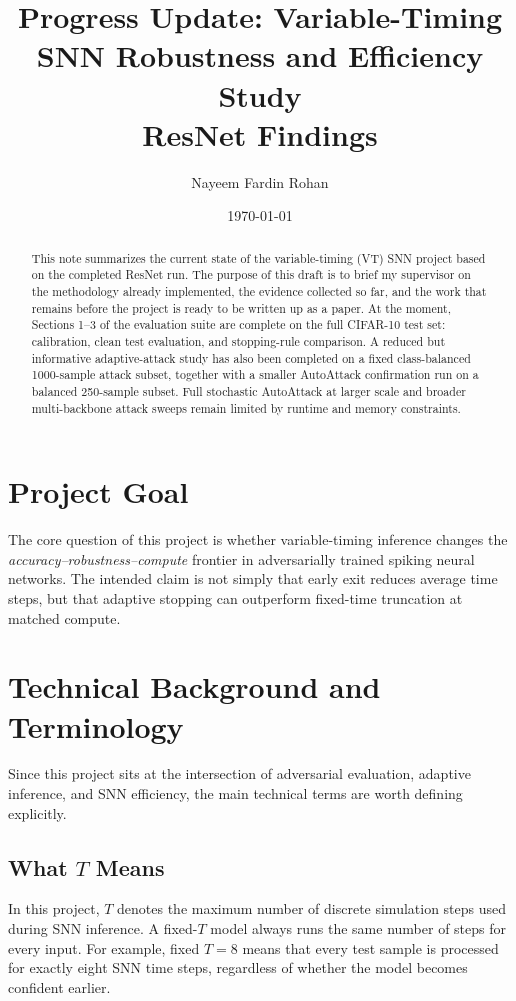 \documentclass[11pt]{article}
\title{Progress Update: Variable-Timing SNN Robustness and Efficiency Study\\ResNet Findings}
\author{Nayeem Fardin Rohan}
\date{\today}
\begin{document}
\maketitle

\begin{abstract}
This note summarizes the current state of the variable-timing (VT) SNN project based on the completed ResNet run. The purpose of this draft is to brief my supervisor on the methodology already implemented, the evidence collected so far, and the work that remains before the project is ready to be written up as a paper. At the moment, Sections 1--3 of the evaluation suite are complete on the full CIFAR-10 test set: calibration, clean test evaluation, and stopping-rule comparison. A reduced but informative adaptive-attack study has also been completed on a fixed class-balanced 1000-sample attack subset, together with a smaller AutoAttack confirmation run on a balanced 250-sample subset. Full stochastic AutoAttack at larger scale and broader multi-backbone attack sweeps remain limited by runtime and memory constraints.
\end{abstract}

\section{Project Goal}
The core question of this project is whether variable-timing inference changes the \emph{accuracy--robustness--compute} frontier in adversarially trained spiking neural networks. The intended claim is not simply that early exit reduces average time steps, but that adaptive stopping can outperform fixed-time truncation at matched compute.

\section{Technical Background and Terminology}
Since this project sits at the intersection of adversarial evaluation, adaptive inference, and SNN efficiency, the main technical terms are worth defining explicitly.

\subsection{What $T$ Means}
In this project, $T$ denotes the maximum number of discrete simulation steps used during SNN inference. A fixed-$T$ model always runs the same number of steps for every input. For example, fixed $T=8$ means that every test sample is processed for exactly eight SNN time steps, regardless of whether the model becomes confident earlier.
\end{document}
